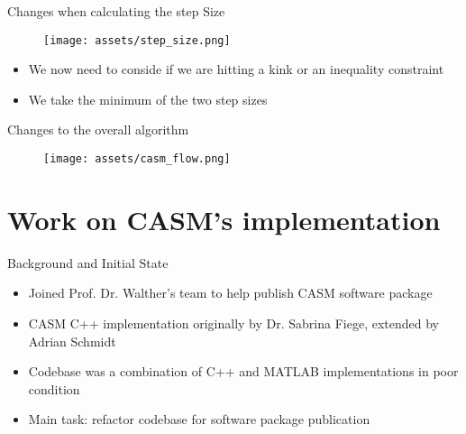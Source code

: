 \documentclass[aspectratio=169]{beamer}
\begin{document}
\begin{frame}{Changes when calculating the step Size}
    \begin{figure}
        \texttt{[image: assets/step\_size.png]}
    \end{figure}

    \begin{itemize}[<+(1)->]
        \item We now need to conside if we are hitting a kink or an inequality
              constraint
        \item We take the minimum of the two step sizes
    \end{itemize}
\end{frame}

\begin{frame}{Changes to the overall algorithm}
    \begin{figure}
        \texttt{[image: assets/casm\_flow.png]}
    \end{figure}
\end{frame}

\section{Work on CASM's implementation}

\begin{frame}{Background and Initial State}
    \begin{itemize}[<+->]
        \item Joined Prof. Dr. Walther's team to help publish CASM software
              package
        \item CASM C++ implementation originally by Dr. Sabrina Fiege, extended
              by Adrian Schmidt
        \item Codebase was a combination of C++ and MATLAB implementations in
              poor condition
        \item Main task: refactor codebase for software package publication
    \end{itemize}

\end{frame}
\end{document}
